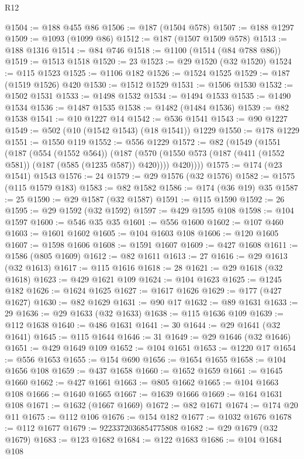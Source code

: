 \begin{lexlean}{R12}
\begin{coremodule}
@1504 := @188 @455 @86
@1506 := @187 (@1504 @578)
@1507 := @188 @1297
@1509 := @1093 (@1099 @86)
@1512 := @187 (@1507 @1509 @578)
@1513 := @188 @1316
@1514 := @84 @746
@1518 := @1100 (@1514 (@84 @788 @86))
@1519 := @1513 @1518
@1520 := 23
@1523 := @29 @1520 (@32 @1520)
@1524 := @115 @1523
@1525 := @1106 @182
@1526 := @1524 @1525
@1529 := @187 (@1519 @1526) @420
@1530 := @1512 @1529
@1531 := @1506 @1530
@1532 := @1502 @1531
@1533 := @1498 @1532
@1534 := @1494 @1533
@1535 := @1490 @1534
@1536 := @1487 @1535
@1538 := @1482 (@1484 @1536)
@1539 := @82 @1538
@1541 := @10 @1227 @14
@1542 := @536 @1541
@1543 := @90 @1227
@1549 := @502 (@10 (@1542 @1543) (@18 @1541)) @1229
@1550 := @178 @1229
@1551 := @1550 @119
@1552 := @556 @1229
@1572 := @82
    (@1549
      (@1551
        (@187
          (@554 (@1552 @564))
          (@187
            (@570 (@1550 @573 (@187 (@411 (@1552 @581)) (@187 (@585 (@1235 @587)) @420))))
            @420))))
@1575 := @174 (@23 @1541) @1543
@1576 := 24
@1579 := @29 @1576 (@32 @1576)
@1582 := @1575 (@115 @1579 @183)
@1583 := @82 @1582
@1586 := @174 (@36 @19) @35
@1587 := 25
@1590 := @29 @1587 (@32 @1587)
@1591 := @115 @1590
@1592 := 26
@1595 := @29 @1592 (@32 @1592)
@1597 := @429 @1595 @108
@1598 := @104 @1597
@1600 := @546 @35 @35
@1601 := @556 @1600
@1602 := @107 @460
@1603 := @1601 @1602
@1605 := @104 @1603 @108
@1606 := @120 @1605
@1607 := @1598 @1606
@1608 := @1591 @1607
@1609 := @427 @1608
@1611 := @1586 (@805 @1609)
@1612 := @82 @1611
@1613 := 27
@1616 := @29 @1613 (@32 @1613)
@1617 := @115 @1616
@1618 := 28
@1621 := @29 @1618 (@32 @1618)
@1623 := @429 @1621 @109
@1624 := @104 @1623
@1625 := @1245 @182
@1626 := @1624 @1625
@1627 := @1617 @1626
@1629 := @177 (@427 @1627)
@1630 := @82 @1629
@1631 := @90 @17
@1632 := @89 @1631
@1633 := 29
@1636 := @29 @1633 (@32 @1633)
@1638 := @115 @1636 @109
@1639 := @112 @1638
@1640 := @486 @1631
@1641 := 30
@1644 := @29 @1641 (@32 @1641)
@1645 := @115 @1644
@1646 := 31
@1649 := @29 @1646 (@32 @1646)
@1651 := @429 @1649 @109
@1652 := @104 @1651
@1653 := @1220 @17
@1654 := @556 @1653
@1655 := @154 @690
@1656 := @1654 @1655
@1658 := @104 @1656 @108
@1659 := @437 @1658
@1660 := @1652 @1659
@1661 := @1645 @1660
@1662 := @427 @1661
@1663 := @805 @1662
@1665 := @104 @1663 @108
@1666 := @1640 @1665
@1667 := @1639 @1666
@1669 := @164 @1631 @108
@1671 := @1632 (@1667 @1669)
@1672 := @82 @1671
@1674 := @174 @20 @11
@1675 := @112 @106
@1676 := @154 @182
@1677 := @1032 @1676
@1678 := @112 @1677
@1679 := 9223372036854775808
@1682 := @29 @1679 (@32 @1679)
@1683 := @123 @1682
@1684 := @122 @1683
@1686 := @104 @1684 @108

\end{coremodule}
\end{lexlean}
